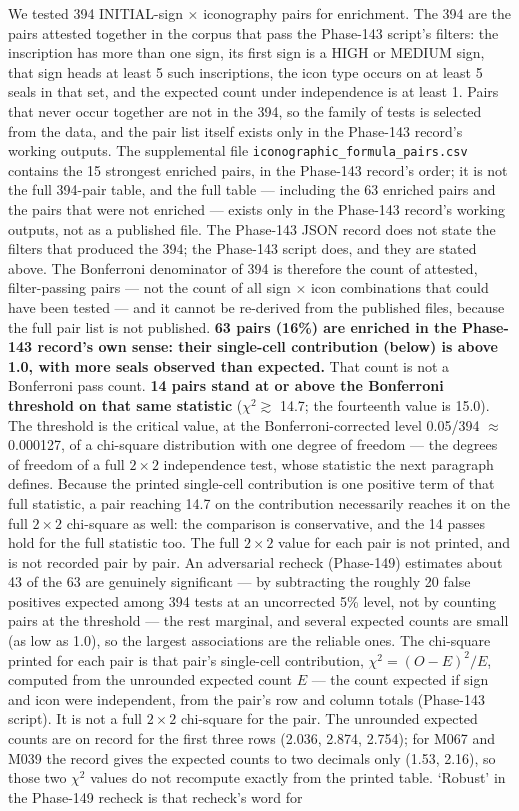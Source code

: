 \documentclass[
]{article}
\begin{document}
We tested 394 INITIAL-sign $\times$ iconography pairs for enrichment. The 394 are the pairs attested together in the corpus that pass the Phase-143 script's filters: the inscription has more than one sign, its first sign is a HIGH or MEDIUM sign, that sign heads at least 5 such inscriptions, the icon type occurs on at least 5 seals in that set, and the expected count under independence is at least 1. Pairs that never occur together are not in the 394, so the family of tests is selected from the data, and the pair list itself exists only in the Phase-143 record's working outputs. The supplemental file \texttt{iconographic\_formula\_pairs.csv} contains the 15 strongest enriched pairs, in the Phase-143 record's order; it is not the full 394-pair table, and the full table --- including the 63 enriched pairs and the pairs that were not enriched --- exists only in the Phase-143 record's working outputs, not as a published file. The Phase-143 JSON record does not state the filters that produced the 394; the Phase-143 script does, and they are stated above. The Bonferroni denominator of 394 is therefore the count of attested, filter-passing pairs --- not the count of all sign $\times$ icon combinations that could have been tested --- and it cannot be re-derived from the published files, because the full pair list is not published. \textbf{63 pairs (16\%) are enriched in the Phase-143 record's own sense: their single-cell contribution (below) is above 1.0, with more seals observed than expected.} That count is not a Bonferroni pass count. \textbf{14 pairs stand at or above the Bonferroni threshold on that same statistic} ($\chi^2 \gtrsim$ 14.7; the fourteenth value is 15.0). The threshold is the critical value, at the Bonferroni-corrected level 0.05/394 $\approx$ 0.000127, of a chi-square distribution with one degree of freedom --- the degrees of freedom of a full $2\times2$ independence test, whose statistic the next paragraph defines. Because the printed single-cell contribution is one positive term of that full statistic, a pair reaching 14.7 on the contribution necessarily reaches it on the full $2\times2$ chi-square as well: the comparison is conservative, and the 14 passes hold for the full statistic too. The full $2\times2$ value for each pair is not printed, and is not recorded pair by pair. An adversarial recheck (Phase-149) estimates about 43 of the 63 are genuinely significant --- by subtracting the roughly 20 false positives expected among 394 tests at an uncorrected 5\% level, not by counting pairs at the threshold --- the rest marginal, and several expected counts are small (as low as 1.0), so the largest associations are the reliable ones. The chi-square printed for each pair is that pair's single-cell contribution, $\chi^2 = (O - E)^2 / E$, computed from the unrounded expected count $E$ --- the count expected if sign and icon were independent, from the pair's row and column totals (Phase-143 script). It is not a full $2\times2$ chi-square for the pair. The unrounded expected counts are on record for the first three rows (2.036, 2.874, 2.754); for M067 and M039 the record gives the expected counts to two decimals only (1.53, 2.16), so those two $\chi^2$ values do not recompute exactly from the printed table. `Robust' in the Phase-149 recheck is that recheck's word for 
\end{document}
